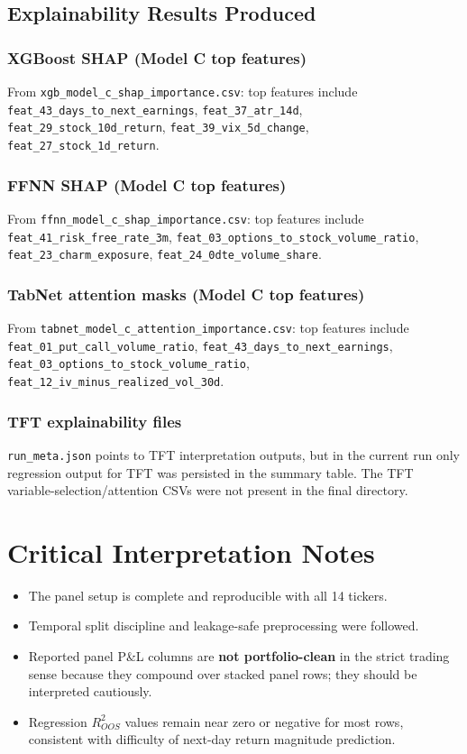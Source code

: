 \documentclass[11pt]{article}
\begin{document}
\subsection{Explainability Results Produced}

\subsubsection*{XGBoost SHAP (Model C top features)}
From \texttt{xgb\_model\_c\_shap\_importance.csv}: top features include
\texttt{feat\_43\_days\_to\_next\_earnings}, \texttt{feat\_37\_atr\_14d},
\texttt{feat\_29\_stock\_10d\_return}, \texttt{feat\_39\_vix\_5d\_change},
\texttt{feat\_27\_stock\_1d\_return}.

\subsubsection*{FFNN SHAP (Model C top features)}
From \texttt{ffnn\_model\_c\_shap\_importance.csv}: top features include
\texttt{feat\_41\_risk\_free\_rate\_3m},
\texttt{feat\_03\_options\_to\_stock\_volume\_ratio},
\texttt{feat\_23\_charm\_exposure},
\texttt{feat\_24\_0dte\_volume\_share}.

\subsubsection*{TabNet attention masks (Model C top features)}
From \texttt{tabnet\_model\_c\_attention\_importance.csv}: top features include
\texttt{feat\_01\_put\_call\_volume\_ratio},
\texttt{feat\_43\_days\_to\_next\_earnings},
\texttt{feat\_03\_options\_to\_stock\_volume\_ratio},
\texttt{feat\_12\_iv\_minus\_realized\_vol\_30d}.

\subsubsection*{TFT explainability files}
\texttt{run\_meta.json} points to TFT interpretation outputs, but in the current run only regression output for TFT was persisted in the summary table. The TFT variable-selection/attention CSVs were not present in the final directory.

\section{Critical Interpretation Notes}
\begin{itemize}[leftmargin=1.2em]
  \item The panel setup is complete and reproducible with all 14 tickers.
  \item Temporal split discipline and leakage-safe preprocessing were followed.
  \item Reported panel P\&L columns are \textbf{not portfolio-clean} in the strict trading sense because they compound over stacked panel rows; they should be interpreted cautiously.
  \item Regression $R^2_{OOS}$ values remain near zero or negative for most rows, consistent with difficulty of next-day return magnitude prediction.
\end{itemize}
\end{document}
